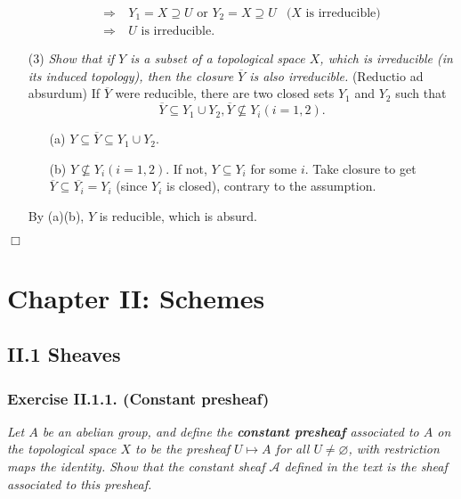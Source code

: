 \documentclass{article}
\begin{document}
\begin{enumerate}
\begin{align*}
  \Longrightarrow& \:
  Y_1 = X \supseteq U \text{ or } Y_2 = X \supseteq U
    &\text{($X$ is irreducible)} \\
  \Longrightarrow& \:
  \text{$U$ is irreducible.}
  \end{align*}
\item[(3)]
\emph{Show that if $Y$ is a subset of a topological space $X$,
which is irreducible (in its induced topology),
then the closure $\overline{Y}$ is also irreducible.}
(Reductio ad absurdum)
If $\overline{Y}$ were reducible, there are two closed sets $Y_1$ and $Y_2$
such that
$$\overline{Y} \subseteq Y_1 \cup Y_2,
\overline{Y} \not\subseteq Y_i (i = 1, 2).$$
  \begin{enumerate}
  \item[(a)]
  $Y \subseteq \overline{Y} \subseteq Y_1 \cup Y_2$.
  \item[(b)]
  $Y\not\subseteq Y_i (i = 1, 2)$. If not, $Y \subseteq Y_i$ for some $i$.
  Take closure to get $\overline{Y} \subseteq \overline{Y_i} = Y_i$ (since $Y_i$ is closed),
  contrary to the assumption.
  \end{enumerate}
  By (a)(b), $Y$ is reducible, which is absurd.
\end{enumerate}
$\Box$ \\






\newpage
\section*{Chapter II: Schemes \\}



\subsection*{II.1 Sheaves \\}



\subsubsection*{Exercise II.1.1. (Constant presheaf)}
\emph{Let $A$ be an abelian group, and define the \textbf{constant presheaf}
associated to $A$ on the topological space $X$ to be
the presheaf $U \mapsto A$ for all $U \neq \varnothing$,
with restriction maps the identity.
Show that the constant sheaf $\mathscr{A}$ defined in the text is
the sheaf associated to this presheaf.} \\
\end{document}
